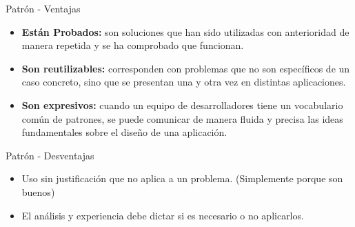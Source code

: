 \begin{frame}{Patr\'on - Ventajas}
	\begin{itemize}
		\item \textbf{Están Probados:} son soluciones que han sido utilizadas con anterioridad de manera
		repetida y se ha comprobado que funcionan.
		\item \textbf{Son reutilizables:} corresponden con problemas que no son espec\'ificos de un caso
		concreto, sino que se presentan una y otra vez en distintas aplicaciones.
		\item \textbf{Son expresivos:} cuando un equipo de desarrolladores tiene un vocabulario com\'un de
		patrones, se puede comunicar de manera fluida y precisa las ideas fundamentales sobre
		el dise\~no de una aplicaci\'on.
	\end{itemize}
\end{frame}

\begin{frame}{Patr\'on - Desventajas}
	\begin{itemize}
		\item Uso sin justificaci\'on que no aplica a un problema. (Simplemente porque son buenos)
		\item El an\'alisis y experiencia debe dictar si es necesario o no aplicarlos.
	\end{itemize}
\end{frame}



%
